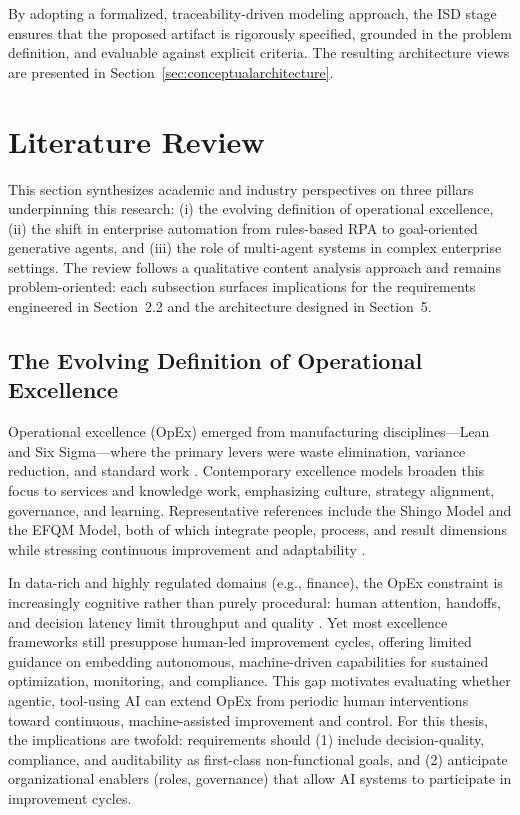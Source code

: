 By adopting a formalized, traceability-driven modeling approach, the ISD stage ensures that the proposed artifact is rigorously specified, grounded in the problem definition, and evaluable against explicit criteria. The resulting architecture views are presented in Section~\ref{sec:conceptualarchitecture}.


\section{Literature Review}
\label{sec:literature-review}

This section synthesizes academic and industry perspectives on three pillars underpinning this research: (i) the evolving definition of operational excellence, (ii) the shift in enterprise automation from rules-based RPA to goal-oriented generative agents, and (iii) the role of multi-agent systems in complex enterprise settings. The review follows a qualitative content analysis approach \parencite{mayringQualitativeContentAnalysis2022} and remains problem-oriented: each subsection surfaces implications for the requirements engineered in Section~2.2 and the architecture designed in Section~5.

\subsection{The Evolving Definition of Operational Excellence}
Operational excellence (OpEx) emerged from manufacturing disciplines—Lean and Six Sigma—where the primary levers were waste elimination, variance reduction, and standard work \parencite{Womack1990,Harry1998}. Contemporary excellence models broaden this focus to services and knowledge work, emphasizing culture, strategy alignment, governance, and learning. Representative references include the Shingo Model and the EFQM Model, both of which integrate people, process, and result dimensions while stressing continuous improvement and adaptability \parencite{Shingo2014,EFQM2020}.

In data-rich and highly regulated domains (e.g., finance), the OpEx constraint is increasingly cognitive rather than purely procedural: human attention, handoffs, and decision latency limit throughput and quality \parencite{Hammer2004,Davenport2018}. Yet most excellence frameworks still presuppose human-led improvement cycles, offering limited guidance on embedding autonomous, machine-driven capabilities for sustained optimization, monitoring, and compliance. This gap motivates evaluating whether agentic, tool-using AI can extend OpEx from periodic human interventions toward continuous, machine-assisted improvement and control. For this thesis, the implications are twofold: requirements should (1) include decision-quality, compliance, and auditability as first-class non-functional goals, and (2) anticipate organizational enablers (roles, governance) that allow AI systems to participate in improvement cycles.

